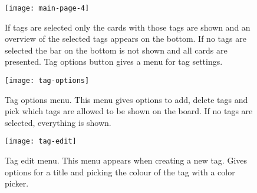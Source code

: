 \begin{figure}[H]
\caption{If tags are selected only the cards with those tags are shown and an overview of the selected tags appears on the bottom. If no tags are selected the bar on the bottom is not shown and all cards are presented. Tag options button gives a menu for tag settings.}
\centering
\texttt{[image: main-page-4]}
\end{figure}

\begin{figure}[H]
\caption{Tag options menu. This menu gives options to add, delete tags and pick which tags are allowed to be shown on the board. If no tags are selected, everything is shown.}
\centering
\texttt{[image: tag-options]}
\end{figure}

\begin{figure}[H]
\caption{Tag edit menu. This menu appears when creating a new tag. Gives options for a title and picking the colour of the tag with a color picker.}
\centering
\texttt{[image: tag-edit]}
\end{figure}
